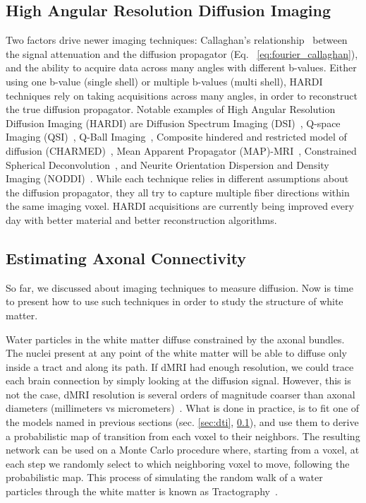 \subsection{High Angular Resolution Diffusion Imaging}
\label{sec:hardi}
Two factors drive newer imaging techniques: Callaghan's relationship~\cite{Callaghan1991}
between the signal attenuation and the diffusion propagator 
(Eq. ~\ref{eq:fourier_callaghan}), and the ability to acquire data across many
angles with different b-values. Either using one b-value (single shell)
or multiple b-values (multi shell), HARDI techniques rely on taking acquisitions
across many angles, in order to reconstruct the true diffusion propagator.
Notable examples of High Angular Resolution Diffusion Imaging (HARDI) are Diffusion
Spectrum Imaging (DSI)~\cite{Wedeen2008}, Q-space Imaging (QSI)~\cite{Callaghan1991},
Q-Ball Imaging~\cite{Tuch2004}, Composite hindered and restricted model of diffusion (CHARMED)~\cite{Assaf2005},
Mean Apparent Propagator (MAP)-MRI~\cite{Ozarslan2013}, 
Constrained Spherical Deconvolution~\cite{Tournier2004}, and Neurite
Orientation Dispersion and Density Imaging (NODDI)~\cite{Zhang2012}. While each technique
relies in different assumptions about the diffusion propagator,
they all try to capture multiple fiber directions within the same imaging
voxel. HARDI acquisitions are currently being improved every day with better 
material and better reconstruction algorithms.

\subsection{Estimating Axonal Connectivity}
So far, we discussed about imaging techniques to measure diffusion. Now is time
to present how to use such techniques in order to study the structure of white matter.

Water particles in the white matter diffuse constrained by the axonal bundles.
The nuclei present at any point of the white matter will be able to diffuse
only inside a tract and along its path. If dMRI had enough resolution, we
could trace each brain connection by simply looking at the diffusion signal.
However, this is not the case, dMRI resolution is several orders of magnitude
coarser than axonal diameters (millimeters vs micrometers)~\cite{VanEssen2014}.
What is done in practice, is to fit one of the models named in previous sections
(sec. \ref{sec:dti}, \ref{sec:hardi}), and use them to derive a probabilistic
map of transition from each voxel to their neighbors. The resulting network can
be used on a Monte Carlo procedure where, starting from a voxel, at each step we
randomly select to which neighboring voxel to move, following the
probabilistic map. This process of simulating the random walk of a water
particles through the white matter is known as Tractography~\cite{Behrens2003a}.

